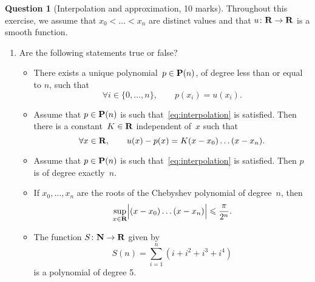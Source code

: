 \documentclass[11pt]{article}
\theoremstyle{definition}
\newtheorem{question}{Question}
\begin{document}
\newpage
\begin{question}
    [Interpolation and approximation, 10 marks]
    Throughout this exercise, we assume
    that $x_0 < \dotsc < x_n$ are distinct values and
    that $u \colon \mathbf R \to \mathbf R$ is a smooth function.

    \begin{enumerate}
        \item
            Are the following statements true or false?
            \begin{itemize}
                \item
                    There exists a unique polynomial~$p \in \mathbf P(n)$,
                    of degree less than or equal to $n$,
                    such that
                    \begin{equation}
                        \label{eq:interpolation}
                        \forall i \in \{0, \dotsc, n\}, \qquad
                        p(x_i) = u (x_i).
                    \end{equation}

                \item
                    Assume that $p \in \mathbf P(n)$ is such that~\eqref{eq:interpolation} is satisfied.
                    Then there is a constant~$K \in \mathbf R$ independent of~$x$ such that
                    \[
                        \forall x \in \mathbf R,
                        \qquad u(x) - p(x) = K (x - x_0) \dotsc (x - x_n).
                    \]

                \item
                    Assume that $p \in \mathbf P(n)$ is such that~\eqref{eq:interpolation} is satisfied.
                    Then $p$ is of degree exactly~$n$.

                \item
                    If $x_0, \dotsc, x_n$ are the roots of the Chebyshev polynomial of degree~$n$,
                    then
                    \[
                        \sup_{x \in \mathbf R} \Bigl\lvert (x - x_0) \dotsc (x - x_n) \Bigr\rvert \leqslant \frac{\pi}{2^n}.
                    \]

                \item
                    The function $S\colon \mathbf N \to \mathbf R$ given by
                    \[
                        S(n) = \sum_{i=1}^{n} \left(i + i^2 + i^3 + i^4\right)
                    \]
                    is a polynomial of degree 5.


\end{itemize}
\end{enumerate}
\end{question}
\end{document}
